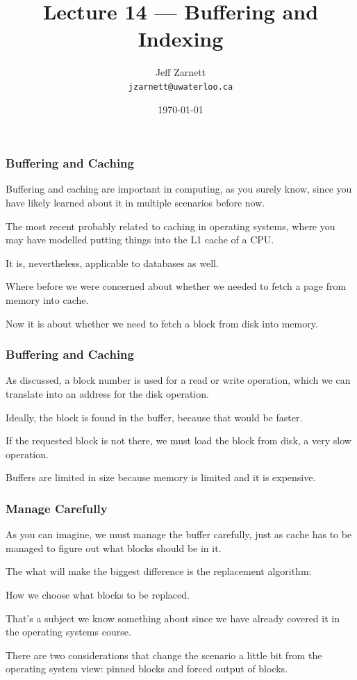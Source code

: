 

\title{Lecture 14 --- Buffering and Indexing }

\author{Jeff Zarnett \\ \small \texttt{jzarnett@uwaterloo.ca}}
\date{\today}




\begin{frame}
  \titlepage

 \end{frame}
 

\begin{frame}
\frametitle{Buffering and Caching}

Buffering and caching are important in computing, as you surely know, since you have likely learned about it in multiple scenarios before now. 

The most recent probably related to caching in operating systems, where you may have modelled putting things into the L1 cache of a CPU. 

It is, nevertheless, applicable to databases as well. 

Where before we were concerned about whether we needed to fetch a page from memory into cache. 

Now it is about whether we need to fetch a block from disk into memory.


\end{frame}

\begin{frame}
\frametitle{Buffering and Caching}

As discussed, a block number is used for a read or write operation, which we can translate into an address for the disk operation. 

Ideally, the block is found in the buffer, because that would be faster. 

If the requested block is not there, we must load the block from disk, a very slow operation. 

Buffers are limited in size because memory is limited and it is expensive.

\end{frame}


\begin{frame}
\frametitle{Manage Carefully}
As you can imagine, we must manage the buffer carefully, just as cache has to be managed to figure out what blocks should be in it. 

The what will make the biggest difference is the replacement algorithm: 

How we choose what blocks to be replaced. 

That's a subject we know something about since we have already covered it in the operating systems course.

There are two considerations that change the scenario a little bit from the operating system view: pinned blocks and forced output of blocks.


\end{frame}

